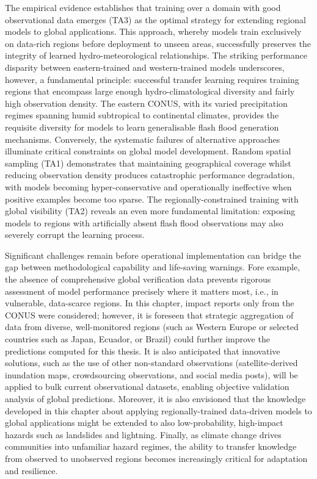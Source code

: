 The empirical evidence establishes that training over a domain with good observational data emerges (TA3) as the optimal strategy for extending regional models to global applications. This approach, whereby models train exclusively on data-rich regions before deployment to unseen areas, successfully preserves the integrity of learned hydro-meteorological relationships. The striking performance disparity between eastern-trained and western-trained models underscores, however, a fundamental principle: successful transfer learning requires training regions that encompass large enough hydro-climatological diversity and fairly high observation density. The eastern CONUS, with its varied precipitation regimes spanning humid subtropical to continental climates, provides the requisite diversity for models to learn generalisable flash flood generation mechanisms. Conversely, the systematic failures of alternative approaches illuminate critical constraints on global model development. Random spatial sampling (TA1) demonstrates that maintaining geographical coverage whilst reducing observation density produces catastrophic performance degradation, with models becoming hyper-conservative and operationally ineffective when positive examples become too sparse. The regionally-constrained training with global visibility (TA2) reveals an even more fundamental limitation: exposing models to regions with artificially absent flash flood observations may also severely corrupt the learning process.

Significant challenges remain before operational implementation can bridge the gap between methodological capability and life-saving warnings. Fore example, the absence of comprehensive global verification data prevents rigorous assessment of model performance precisely where it matters most, i.e., in vulnerable, data-scarce regions. In this chapter, impact reports only from the CONUS were considered; however, it is foreseen that strategic aggregation of data from diverse, well-monitored regions (such as Western Europe or selected countries such as Japan, Ecuador, or Brazil) could further improve the predictions computed for this thesis. It is also anticipated that innovative solutions, such as the use of other non-standard observations (satellite-derived inundation maps, crowdsourcing observations, and social media posts), will be applied to bulk current observational datasets, enabling objective validation analysis of global predictions. Moreover, it is also envisioned that the knowledge developed in this chapter about applying regionally-trained data-driven models to global applications might be extended to also low-probability, high-impact hazards such as landslides and lightning. Finally, as climate change drives communities into unfamiliar hazard regimes, the ability to transfer knowledge from observed to unobserved regions becomes increasingly critical for adaptation and resilience.